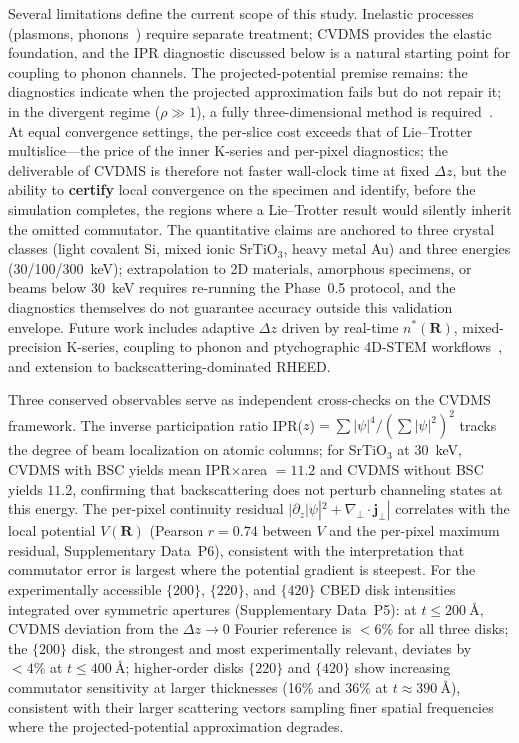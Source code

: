 \documentclass[twoside,11pt]{article}
\begin{document}
Several limitations define the current scope of this study. Inelastic processes (plasmons, phonons~\cite{Forbes2010}) require separate treatment; CVDMS provides the elastic foundation, and the IPR diagnostic discussed below is a natural starting point for coupling to phonon channels. The projected-potential premise remains: the diagnostics indicate when the projected approximation fails but do not repair it; in the divergent regime ($\rho\gg1$), a fully three-dimensional method is required~\cite{LobatoVanDyck2014}. At equal convergence settings, the per-slice cost exceeds that of Lie--Trotter multislice---the price of the inner K-series and per-pixel diagnostics; the deliverable of CVDMS is therefore not faster wall-clock time at fixed $\Delta z$, but the ability to \textbf{certify} local convergence on the specimen and identify, before the simulation completes, the regions where a Lie--Trotter result would silently inherit the omitted commutator. The quantitative claims are anchored to three crystal classes (light covalent Si, mixed ionic SrTiO$_3$, heavy metal Au) and three energies (30/100/300~keV); extrapolation to 2D materials, amorphous specimens, or beams below \SI{30}{\keV} requires re-running the Phase~0.5 protocol, and the diagnostics themselves do not guarantee accuracy outside this validation envelope. Future work includes adaptive $\Delta z$ driven by real-time $n^*(\mathbf{R})$, mixed-precision K-series, coupling to phonon and ptychographic 4D-STEM workflows~\cite{Savitzky2021}, and extension to backscattering-dominated RHEED.

Three conserved observables serve as independent cross-checks on the CVDMS framework.\label{sec:conserved-observables} The inverse participation ratio IPR($z$)$=\sum|\psi|^4/(\sum|\psi|^2)^2$ tracks the degree of beam localization on atomic columns; for SrTiO$_3$ at \SI{30}{\keV}, CVDMS with BSC yields mean IPR$\times$area $=11.2$ and CVDMS without BSC yields $11.2$, confirming that backscattering does not perturb channeling states at this energy. The per-pixel continuity residual $|\partial_z|\psi|^2+\nabla_\perp\cdot\mathbf{j}_\perp|$ correlates with the local potential $V(\mathbf{R})$ (Pearson $r=0.74$ between $V$ and the per-pixel maximum residual, Supplementary Data~P6), consistent with the interpretation that commutator error is largest where the potential gradient is steepest. For the experimentally accessible $\{200\}$, $\{220\}$, and $\{420\}$ CBED disk intensities integrated over symmetric apertures (Supplementary Data~P5): at $t\le\SI{200}{\angstrom}$, CVDMS deviation from the $\Delta z\to0$ Fourier reference is $<6\%$ for all three disks; the $\{200\}$ disk, the strongest and most experimentally relevant, deviates by $<4\%$ at $t\le\SI{400}{\angstrom}$; higher-order disks $\{220\}$ and $\{420\}$ show increasing commutator sensitivity at larger thicknesses (16\% and 36\% at $t\approx\SI{390}{\angstrom}$), consistent with their larger scattering vectors sampling finer spatial frequencies where the projected-potential approximation degrades.
\end{document}
